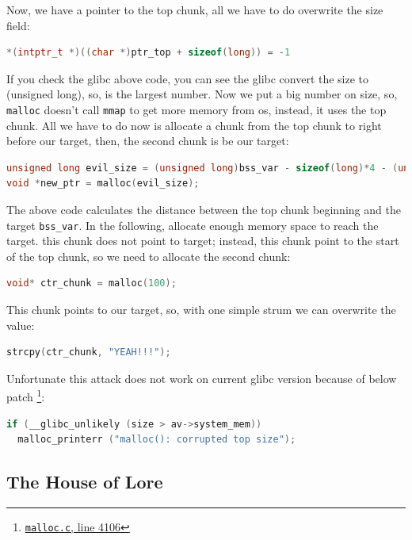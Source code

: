 \documentclass{masterthesis}
\newcommand*\libc{glibc}
\newcommand*\mallocc{\lstinline{malloc}}
\newcommand*\mmapc{\lstinline{mmap}}
\begin{document}
Now, we have a pointer to the top chunk, all we have to do overwrite the size field:

\begin{lstlisting}[language=c,frame=tlrb]
*(intptr_t *)((char *)ptr_top + sizeof(long)) = -1
\end{lstlisting}

If you check the \libc{} above code, you can see the \libc{} convert the size to (unsigned long), so,  is the largest number. Now we put a big number on size, so, \mallocc{} doesn’t call \mmapc{} to get more memory from os, instead, it uses the top chunk. All we have to do now is allocate a chunk from the top chunk to right before our target, then, the second chunk is be our target:

\begin{lstlisting}[language=c,frame=tlrb]
unsigned long evil_size = (unsigned long)bss_var - sizeof(long)*4 - (unsigned long)ptr_top;
void *new_ptr = malloc(evil_size);
\end{lstlisting}

The above code calculates the distance between the top chunk beginning and the target \lstinline{bss_var}. In the following, allocate enough memory space to reach the target. this chunk does not point to target; instead, this chunk point to the start of the top chunk, so we need to allocate the second chunk:

\begin{lstlisting}[language=c,frame=tlrb]
void* ctr_chunk = malloc(100);
\end{lstlisting}

This chunk points to our target, so, with one simple strum we can overwrite the value:

\begin{lstlisting}[language=c,frame=tlrb]
strcpy(ctr_chunk, "YEAH!!!");
\end{lstlisting}

Unfortunate this attack does not work on current \libc{} version because of below patch \footnote{\href{https://sourceware.org/git/?p=glibc.git;a=blob;f=malloc/malloc.c;h=f7cd29bc2f93e1082ee77800bd64a4b2a2897055;hb=9ea3686266dca3f004ba874745a4087a89682617\#l4106}{\texttt{malloc.c}, line 4106}}:
\begin{lstlisting}[language=c,frame=tlrb]
if (__glibc_unlikely (size > av->system_mem))
  malloc_printerr ("malloc(): corrupted top size");
\end{lstlisting}

\subsection{The House of Lore}
\end{document}
